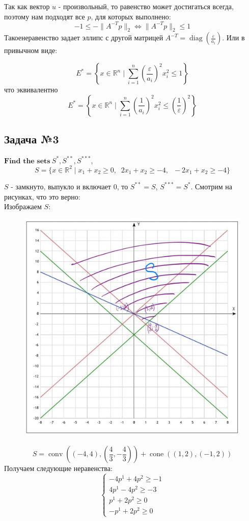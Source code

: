 \documentclass[12pt,letterpaper]{article}
\begin{document}
Так как вектор $ u $ - произвольный, то равенство может достигаться всегда, поэтому нам подходят все $ p $, для которых выполнено:
$$
-1 \leq - \| A^{-T} p \|_2 \Leftrightarrow \| A^{-T} p \|_2 \leq 1
$$
Такоенеравенство задает эллипс с другой матрицей $ A^{-T} = \operatorname{diag} (\frac{\varepsilon}{a_i})$. Или в привычном виде:

$$
E^* = \left\{ x \in \mathbb{R}^n \mid \sum\limits_{i = 1}^n \left( \frac{\varepsilon}{a_i} \right) ^2  x_i^2 \le 1 \right\}
$$
что эквивалентно
$$
E^* = \left\{ x \in \mathbb{R}^n \mid \sum\limits_{i = 1}^n \left( \frac{1}{a_i} \right) ^2  x_i^2 \le \left( \frac{1}{\varepsilon} \right)^2 \right\}
$$

\subsection*{Задача №3}
$\textbf{Find the sets}\ S^{*}, S^{**}, S^{***}$,     
$$
S = \{ x \in \mathbb{R}^2 \mid x_1 + x_2 \ge 0, \;\; 2x_1 + x_2 \ge -4, \;\; -2x_1 + x_2 \ge -4\}
$$

$ S $ - замкнуто, выпукло и включает 0, то $ S^{**} = S $, $ S^{***} = S^{*} $. Смотрим на рисунках, что это верно:\\
Изображаем $ S $:
\begin{figure}[h!]
\begin{minipage}[h]{1\linewidth}
\begin{center}
\includegraphics[width=0.6\linewidth]{S}
\end{center}
\end{minipage}
\end{figure}

$$
S=\operatorname{conv}\left((-4, 4), (\frac{4}{3}, -\frac{4}{3}) \right)+\operatorname{cone}\left((1,2), (-1, 2) \right)
$$
\newpage
Получаем следующие неравенства: 
$$
\left\{\begin{array}{c}
-4 p^{1}+4 p^{2} \geq-1 \\
4 p^{1}-4 p^{2} \geq-3 \\
p^{1}+2 p^{2} \geq 0 \\
-p^{1}+2 p^{2} \geq 0
\end{array}\right.
$$
\end{document}
